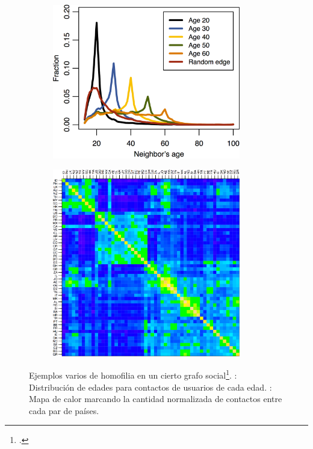 \documentclass{beamer}
\begin{document}
\begin{frame}
	\begin{figure}
		\begin{subfigure}[b]{0.48\framewidth}
			\includegraphics[width=0.9\textwidth]{age_homophily.png}
			\caption{}%
			\label{fig:age_homophily}
		\end{subfigure}
		\begin{subfigure}[b]{0.48\framewidth}
			\hfill{}
			\includegraphics[width=0.9\textwidth]{country_homophily.png}
			\caption{}%
			\label{fig:country_homophily}
		\end{subfigure}
		\caption{Ejemplos varios de homofilia en un cierto grafo social\footcite{ugander2011anatomy}. : Distribución de edades para contactos de usuarios de cada edad. : Mapa de calor marcando la cantidad normalizada de contactos entre cada par de países.}
	\end{figure}


\end{frame}
\end{document}
